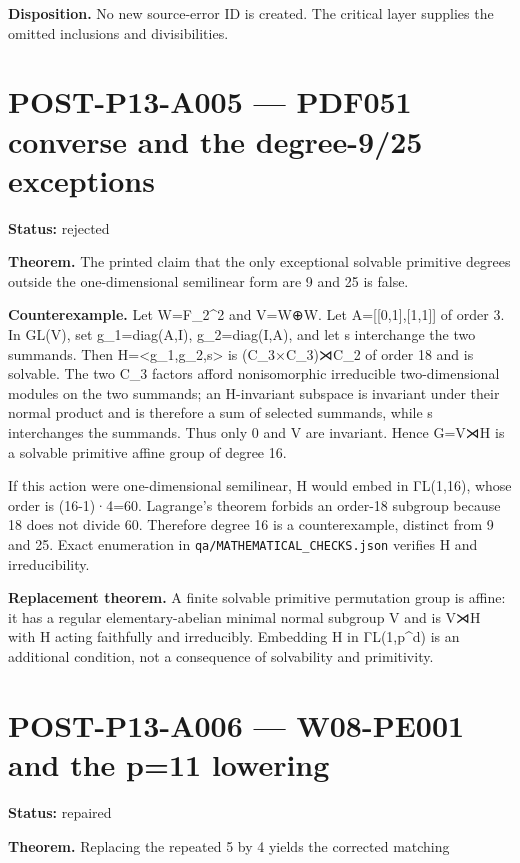 \documentclass[
  10pt,
  a4paper,
]{scrreprt}
\begin{document}
\textbf{Disposition.} No new source-error ID is created. The critical
layer supplies the omitted inclusions and divisibilities.

\section{POST-P13-A005 --- PDF051 converse and the degree-9/25
exceptions}\label{post-p13-a005-pdf051-converse-and-the-degree-925-exceptions}

\textbf{Status:} rejected

\textbf{Theorem.} The printed claim that the only exceptional solvable
primitive degrees outside the one-dimensional semilinear form are 9 and
25 is false.

\textbf{Counterexample.} Let W=F\_2\^{}2 and V=W⊕W. Let
A={[}{[}0,1{]},{[}1,1{]}{]} of order 3. In GL(V), set g\_1=diag(A,I),
g\_2=diag(I,A), and let s interchange the two summands. Then
H=\textless g\_1,g\_2,s\textgreater{} is (C\_3×C\_3)⋊C\_2 of order 18
and is solvable. The two C\_3 factors afford nonisomorphic irreducible
two-dimensional modules on the two summands; an H-invariant subspace is
invariant under their normal product and is therefore a sum of selected
summands, while s interchanges the summands. Thus only 0 and V are
invariant. Hence G=V⋊H is a solvable primitive affine group of degree
16.

If this action were one-dimensional semilinear, H would embed in
ΓL(1,16), whose order is (16-1)·4=60. Lagrange's theorem forbids an
order-18 subgroup because 18 does not divide 60. Therefore degree 16 is
a counterexample, distinct from 9 and 25. Exact enumeration in
\texttt{qa/MATHEMATICAL\_CHECKS.json} verifies \textbar H and
irreducibility.

\textbf{Replacement theorem.} A finite solvable primitive permutation
group is affine: it has a regular elementary-abelian minimal normal
subgroup V and is V⋊H with H acting faithfully and irreducibly.
Embedding H in ΓL(1,p\^{}d) is an additional condition, not a
consequence of solvability and primitivity.

\section{POST-P13-A006 --- W08-PE001 and the p=11
lowering}\label{post-p13-a006-w08-pe001-and-the-p11-lowering}

\textbf{Status:} repaired

\textbf{Theorem.} Replacing the repeated 5 by 4 yields the corrected
matching
\end{document}
